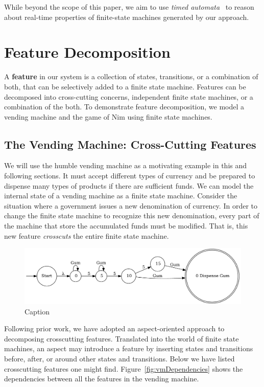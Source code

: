 \documentclass[sigplan,anonymous,review]{acmart}
\begin{document}
While beyond the scope of this paper, we aim to use \emph{timed automata}~\cite{10.1145/2518102} to reason about real-time properties of finite-state machines generated by our approach.

\section{Feature Decomposition}
A \textbf{feature} in our system is a collection of states, transitions, or a combination of both, that can be selectively added to a finite state machine. Features can be decomposed into cross-cutting concerns, independent finite state machines, or a combination of the both. To demonstrate feature decomposition, we model a vending machine and the game of Nim using finite state machines.

\subsection{The Vending Machine: Cross-Cutting Features}\label{sec:vend}
We will use the humble vending machine as a motivating example in this and following sections. It must accept different types of currency and be prepared to dispense many types of products if there are sufficient funds. We can model the internal state of a vending machine as a finite state machine. Consider the situation where a government issues a new denomination of currency. In order to change the finite state machine to recognize this new denomination, every part of the machine that store the accumulated funds must be modified. That is, this new feature \emph{crosscuts} the entire finite state machine.

\begin{figure}
    \centering
    \includegraphics[width=\textwidth]{figures/vend1.pdf}
    \caption{Caption}
    \label{fig:my_label}
\end{figure}

Following prior work, we have adopted an aspect-oriented approach to decomposing crosscutting features. Translated into the world of finite state machines, an aspect may introduce a feature by inserting states and transitions before, after, or around other states and transitions. Below we have listed crosscutting features one might find. Figure~\ref{fig:vmDependencies} shows the dependencies between all the features in the vending machine.
\end{document}
